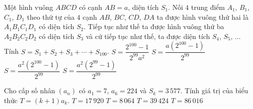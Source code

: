 \begin{ex}%
	Một hình vuông $ABCD$ có cạnh $AB=a$, diện tích $S_1$. Nối $4$ trung  điểm $A_1$, $B_1$, $C_1$, $D_1$ theo thứ tự của $4$ cạnh $AB$, $BC$, $CD$, $DA$ ta được hình vuông thứ hai là $A_1B_1C_1D_1$ có diện tích $S_2$. Tiếp tục như thế ta được hình vuông thứ ba $A_2B_2C_2D_2$ có diện tích $S_3$ và cứ tiếp tục như thế, ta được diện tích $S_4$, $S_5$, $\ldots$ Tính $S=S_1+S_2+S_3+\cdots+S_{100}$.
	 \choice
		{$S=\dfrac{2^{100}-1}{2^{99}  a^2}$}
		{$S=\dfrac{a\left(2^{100}-1\right)}{2^{99}}$} 
		{\True $S=\dfrac{a^2\left(2^{100}-1\right)}{2^{99}}$} 
		{$S=\dfrac{a^2\left(2^{99}-1\right)}{2^{99}}$} 
\end{ex}

\begin{ex}%
	Cho cấp số nhân $(a_n)$ có $a_1=7$, $a_6=224$ và $S_k=3\,577$. Tính  giá trị của biểu thức $T=(k+1) a_k$.
	\choice 
		{\True  $T=17\,920$}
		{$T=8\,064$} 
		{$T=39\,424$} 
		{$T=86\,016$} 
\end{ex}

